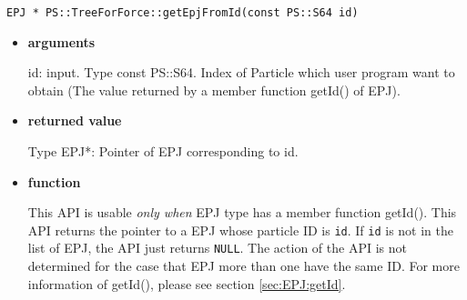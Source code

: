 \begin{screen}
\begin{verbatim}
EPJ * PS::TreeForForce::getEpjFromId(const PS::S64 id)
\end{verbatim}
\end{screen}

\begin{itemize}

\item {\bf arguments}

id: input. Type const PS::S64. Index of Particle which user program
want to obtain (The value returned by a member function getId() of
EPJ).

\item {\bf returned value}

Type EPJ*: Pointer of EPJ corresponding to id.

\item {\bf function}

This API is usable \textit{only when} EPJ type has a member function
getId(). This API returns the pointer to a EPJ whose particle ID
is \texttt{id}. If \texttt{id} is not in the list of EPJ, the API just
returns \texttt{NULL}. The action of the API is not determined for the
case that EPJ more than one have the same ID.  For more information of
getId(), please see section \ref{sec:EPJ:getId}.


\end{itemize}
